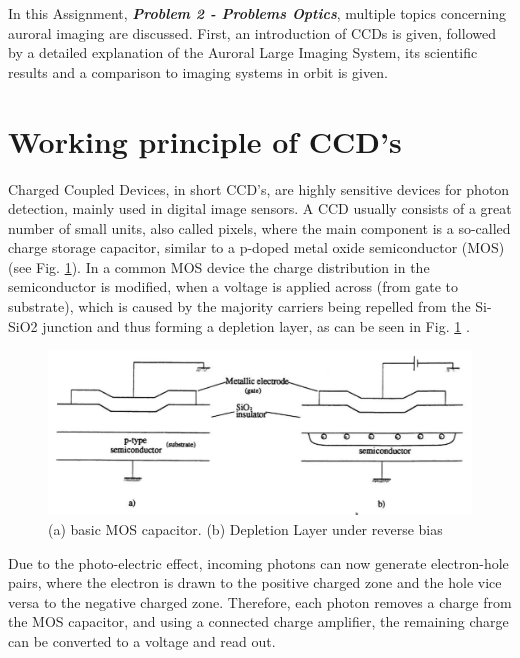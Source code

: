 

In this Assignment, \textit{\textbf{Problem 2 - Problems Optics}}, multiple topics concerning auroral imaging are discussed. First, an introduction of CCDs is given, followed by a detailed explanation of the Auroral Large Imaging System, its scientific results and a comparison to imaging systems in orbit is given.


\section{Working principle of CCD's}
Charged Coupled Devices, in short CCD's, are highly sensitive devices for photon detection, mainly used in digital image sensors. A CCD usually consists of a great number of small units, also called pixels, where the main component is a so-called charge storage capacitor, similar to a p-doped metal oxide semiconductor (MOS) (see Fig. \ref{fig:mos}).
In a common MOS device the charge distribution in the semiconductor is modified, when a voltage is applied across  (from gate to substrate), which is caused by the majority carriers being repelled from the Si-SiO2 junction and thus forming a depletion layer, as can be seen in Fig. \ref{fig:mos} \citep[c.f.][chap. 6.8.1]{hoymorksensors}.

\begin{figure}[!htbp]
	\centering
	\includegraphics[width=\linewidth]{images/mos}
		\caption{(a) basic MOS capacitor. (b) Depletion Layer under reverse bias \citep[c.f.][fig. 6.20]{hoymorksensors} }
		 \label{fig:mos}
\end{figure}

Due to the photo-electric effect, incoming photons can now generate electron-hole pairs, where the electron is drawn to the positive charged zone and the hole vice versa to the negative charged zone. Therefore, each photon removes a charge from the MOS capacitor, and using a connected charge amplifier, the remaining charge can be converted to a voltage and read out.

